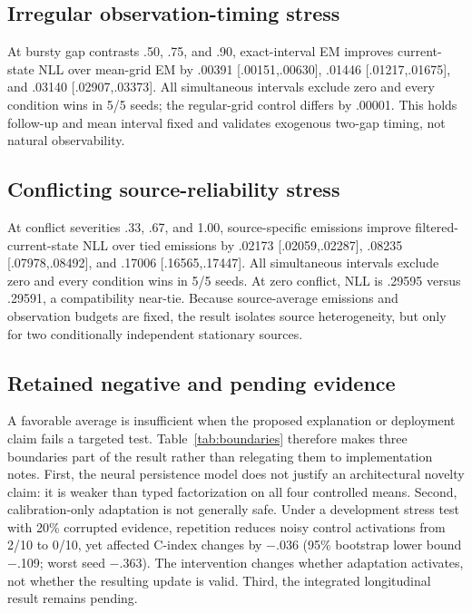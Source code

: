 \documentclass{article}
\begin{document}
\subsection{Irregular observation-timing stress}
At bursty gap contrasts .50, .75, and .90, exact-interval EM improves current-state NLL over mean-grid EM by .00391 [.00151,.00630], .01446 [.01217,.01675], and .03140 [.02907,.03373]. All simultaneous intervals exclude zero and every condition wins in 5/5 seeds; the regular-grid control differs by .00001. This holds follow-up and mean interval fixed and validates exogenous two-gap timing, not natural observability.

\subsection{Conflicting source-reliability stress}
At conflict severities .33, .67, and 1.00, source-specific emissions improve filtered-current-state NLL over tied emissions by .02173 [.02059,.02287], .08235 [.07978,.08492], and .17006 [.16565,.17447]. All simultaneous intervals exclude zero and every condition wins in 5/5 seeds. At zero conflict, NLL is .29595 versus .29591, a compatibility near-tie. Because source-average emissions and observation budgets are fixed, the result isolates source heterogeneity, but only for two conditionally independent stationary sources.

\subsection{Retained negative and pending evidence}
A favorable average is insufficient when the proposed explanation or deployment claim fails a targeted test. Table~\ref{tab:boundaries} therefore makes three boundaries part of the result rather than relegating them to implementation notes. First, the neural persistence model does not justify an architectural novelty claim: it is weaker than typed factorization on all four controlled means. Second, calibration-only adaptation is not generally safe. Under a development stress test with 20\% corrupted evidence, repetition reduces noisy control activations from 2/10 to 0/10, yet affected C-index changes by $-$.036 (95\% bootstrap lower bound $-$.109; worst seed $-$.363). The intervention changes whether adaptation activates, not whether the resulting update is valid. Third, the integrated longitudinal result remains pending.
\end{document}
